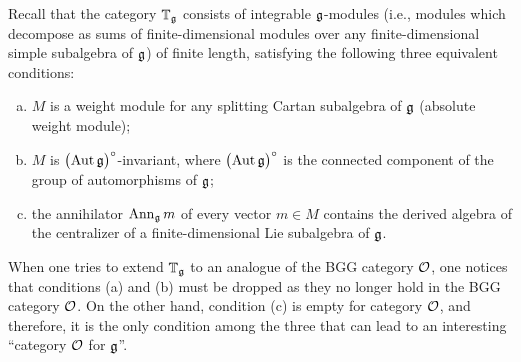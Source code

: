 \documentclass[12pt]{amsart}
\makeatletter
\def\mathbb{\Bbb}
\def\mathfrak{\frak}
\def\mathcal{\cal}
\def\@putname#1#2#3#4{\def\@@ref{#3}\let\old@bf\bf
        \def\bf##1{\old@bf\if?\noexpand##1?{#4}\else##1\fi}%
        #1{#2}%
        \let\bf\old@bf}
\def\@putname#1#2#3#4{\def\@@ref{#3}\let\old@bf\bf    %
        \let\old@reset@font\reset@font                  %
        \def\bf##1{\old@bf\if?\noexpand##1?{#4}\else##1\fi}%
        \def\reset@font##1##2{\old@reset@font##1\if?\noexpand##2?{#4}\else##2\fi}#1{#2}%
        \let\bf\old@bf\let\reset@font\old@reset@font}
\let\my@cite=\cite
\def\cite#1{\@putname\my@cite{#1}{\@citeb}{\tiny\rm\@@ref}}
\theoremstyle{plain} %
\numberwithin{equation}{section}
\theoremstyle{definition}
\theoremstyle{remark}
\theoremstyle{plain} %
\makeatother
\begin{document}
	  Recall that the category $\mathbb{T}_{\mathfrak{g}}$ consists of integrable $\mathfrak{g}$-modules (i.e., modules which decompose as sums of finite-dimensional modules over any finite-dimensional simple subalgebra of $\mathfrak{g}$) of finite length, satisfying the following three equivalent conditions:	
	\begin{enumerate}[(a)]
		\item $M$ is a weight module for any splitting Cartan subalgebra of $\mathfrak{g}$ (absolute weight module);
		\item $M$ is $\big(\mathrm{Aut}\,\mathfrak{g}\big)^\circ$-invariant, where $\big(\mathrm{Aut}\,\mathfrak{g}\big)^\circ$ is the connected component of the group of automorphisms of $\mathfrak{g}$;
\item the annihilator $\mathrm{Ann}_{\mathfrak{g}}\,m$ of every vector $m\in M$ contains the derived algebra of the centralizer of a finite-dimensional Lie subalgebra of $\mathfrak{g}$.
\end{enumerate}
When one tries to extend $\mathbb{T}_{\mathfrak{g}}$  to an analogue of the BGG category $\mathcal{O}$, one notices that conditions (a) and (b) must be dropped as they no longer hold in the BGG category $\mathcal{O}$.  On the other hand, condition (c) is empty for category $\mathcal{O}$, and therefore, it is the only condition among the three that can lead to an interesting ``category $\mathcal{O}$ for $\mathfrak{g}$''. 
	
	

	
       
\end{document}
